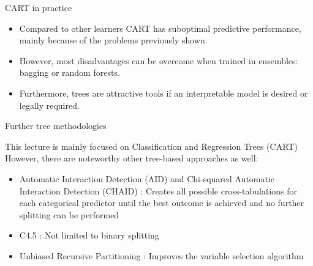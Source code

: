 \documentclass[11pt,compress,t,notes=noshow, xcolor=table]{beamer}
\begin{document}
\begin{vbframe}{CART in practice}

\begin{itemize}
\item Compared to other learners CART has suboptimal predictive performance, mainly because of the problems previously shown.
\item However, most disadvantages can be overcome when trained in ensembles: bagging or random forests.
\item Furthermore, trees are attractive tools if an interpretable model is desired or legally required.
\end{itemize}



\end{vbframe}

\begin{vbframe}{Further tree methodologies}

This lecture is mainly focused on Classification and Regression Trees (CART)  \\
However, there are noteworthy other tree-based approaches as well:

\begin{itemize}
\item Automatic Interaction Detection (AID)  and Chi-squared Automatic Interaction Detection (CHAID) : Creates all possible cross-tabulations for each categorical predictor until the best outcome is achieved and no further splitting can be performed
\item C4.5 : Not limited to binary splitting
\item Unbiased Recursive Partitioning : Improves the variable selection algorithm
\end{itemize}

\end{vbframe}

\endlecture
\end{document}
